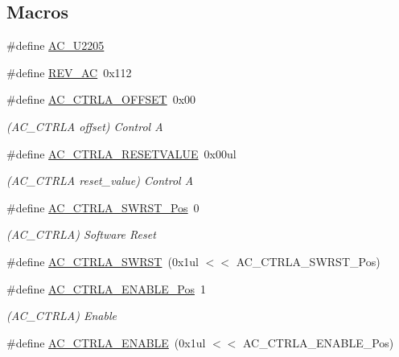 \subsection*{Macros}
\begin{DoxyCompactItemize}
\item 
\#define \mbox{\hyperlink{group___s_a_m_d21___a_c_ga1bb2b0296baa8fe0ca252b0db4caa5de}{A\+C\+\_\+\+U2205}}
\item 
\#define \mbox{\hyperlink{group___s_a_m_d21___a_c_gad5caae49643e4b678d0e176955aa27b4}{R\+E\+V\+\_\+\+AC}}~0x112
\item 
\#define \mbox{\hyperlink{group___s_a_m_d21___a_c_ga2b8253e09cb53fcb96e93f5d425a97b4}{A\+C\+\_\+\+C\+T\+R\+L\+A\+\_\+\+O\+F\+F\+S\+ET}}~0x00
\begin{DoxyCompactList}\small\item\em (A\+C\+\_\+\+C\+T\+R\+LA offset) Control A \end{DoxyCompactList}\item 
\#define \mbox{\hyperlink{group___s_a_m_d21___a_c_gac3bf7345c9e6bd9c13b215f211805368}{A\+C\+\_\+\+C\+T\+R\+L\+A\+\_\+\+R\+E\+S\+E\+T\+V\+A\+L\+UE}}~0x00ul
\begin{DoxyCompactList}\small\item\em (A\+C\+\_\+\+C\+T\+R\+LA reset\+\_\+value) Control A \end{DoxyCompactList}\item 
\#define \mbox{\hyperlink{group___s_a_m_d21___a_c_gab2cf4a760261959d3e1b82e930e1bb98}{A\+C\+\_\+\+C\+T\+R\+L\+A\+\_\+\+S\+W\+R\+S\+T\+\_\+\+Pos}}~0
\begin{DoxyCompactList}\small\item\em (A\+C\+\_\+\+C\+T\+R\+LA) Software Reset \end{DoxyCompactList}\item 
\#define \mbox{\hyperlink{group___s_a_m_d21___a_c_ga891d9849387c8a65811ddea96b12ab46}{A\+C\+\_\+\+C\+T\+R\+L\+A\+\_\+\+S\+W\+R\+ST}}~(0x1ul $<$$<$ A\+C\+\_\+\+C\+T\+R\+L\+A\+\_\+\+S\+W\+R\+S\+T\+\_\+\+Pos)
\item 
\#define \mbox{\hyperlink{group___s_a_m_d21___a_c_ga6ca649f4703d6b341f61a8f9d7a679b9}{A\+C\+\_\+\+C\+T\+R\+L\+A\+\_\+\+E\+N\+A\+B\+L\+E\+\_\+\+Pos}}~1
\begin{DoxyCompactList}\small\item\em (A\+C\+\_\+\+C\+T\+R\+LA) Enable \end{DoxyCompactList}\item 
\#define \mbox{\hyperlink{group___s_a_m_d21___a_c_gaa9eb0e8fa6387220d3b0a3840139c29a}{A\+C\+\_\+\+C\+T\+R\+L\+A\+\_\+\+E\+N\+A\+B\+LE}}~(0x1ul $<$$<$ A\+C\+\_\+\+C\+T\+R\+L\+A\+\_\+\+E\+N\+A\+B\+L\+E\+\_\+\+Pos)

\end{DoxyCompactItemize}
